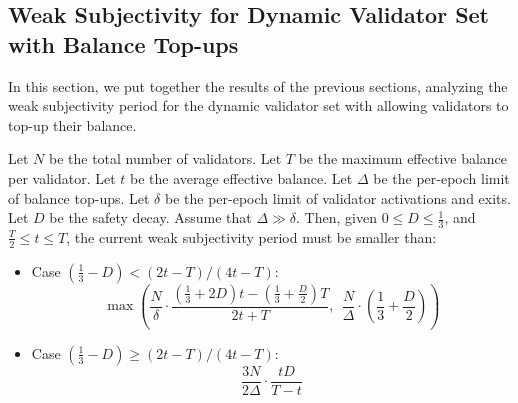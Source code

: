 \subsection{Weak Subjectivity for Dynamic Validator Set with Balance Top-ups}

In this section, we put together the results of the previous sections, analyzing the weak subjectivity period for the dynamic validator set with allowing validators to top-up their balance.

\begin{theorem}\label{thm:weak-subjectivity-balance-top-ups}
Let $N$ be the total number of validators.
Let $T$ be the maximum effective balance per validator.
Let $t$ be the average effective balance.
Let $\Delta$ be the per-epoch limit of balance top-ups.
Let $\delta$ be the per-epoch limit of validator activations and exits.
Let $D$ be the safety decay.
%
Assume that $\Delta \gg \delta$.
Then, given $0 \le D \le \frac{1}{3}$, and $\frac{T}{2} \le t \le T$, the current weak subjectivity period must be smaller than:\footnotemark
\begin{itemize}
\item Case $(\frac{1}{3} - D) < (2t - T)/(4t - T)$:
\[
\max\left(
\frac{N}{\delta} \cdot \frac{(\frac{1}{3} + 2D)t - (\frac{1}{3} + \frac{D}{2})T}{2t+T},~~
\frac{N}{\Delta} \cdot (\frac{1}{3} + \frac{D}{2}) %
\right)
\]
\item Case $(\frac{1}{3} - D) \ge (2t - T)/(4t - T)$:
\[
\frac{3N}{2\Delta} \cdot \frac{tD}{T-t}
\]
\end{itemize}
\end{theorem}
